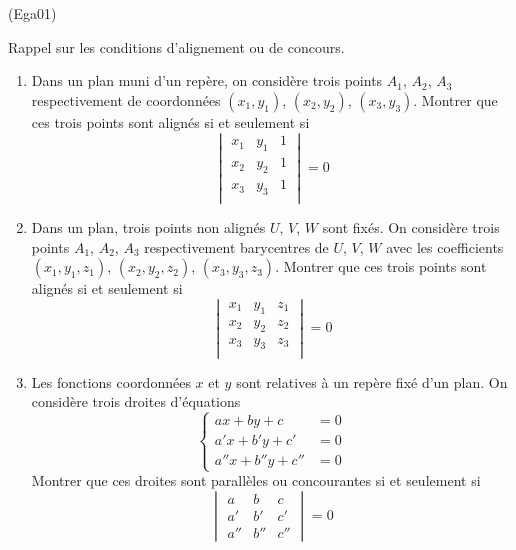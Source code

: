 \begin{tiny}(Ega01)\end{tiny} Rappel sur les conditions d'alignement ou de concours.
\begin{enumerate}
 \item Dans un plan muni d'un repère, on considère trois points $A_1$, $A_2$, $A_3$ respectivement de coordonnées $(x_1,y_1)$, $(x_2,y_2)$, $(x_3,y_3)$. Montrer que ces trois points sont alignés si et seulement si
\begin{displaymath}
 \begin{vmatrix}
  x_1 & y_1 & 1 \\
  x_2 & y_2 & 1 \\
  x_3 & y_3 & 1 \\
 \end{vmatrix}
=0
\end{displaymath}
\item Dans un plan, trois points non alignés $U$, $V$, $W$ sont fixés. On considère trois points $A_1$, $A_2$, $A_3$ respectivement barycentres de $U$, $V$, $W$ avec les coefficients $(x_1,y_1,z_1)$, $(x_2,y_2,z_2)$, $(x_3,y_3,z_3)$.
 Montrer que ces trois points sont alignés si et seulement si
\begin{displaymath}
 \begin{vmatrix}
  x_1 & y_1 & z_1 \\
  x_2 & y_2 & z_2 \\
  x_3 & y_3 & z_3 \\
 \end{vmatrix}
=0
\end{displaymath}
\item Les fonctions coordonnées $x$ et $y$ sont relatives à un repère fixé d'un plan. On considère trois droites d'équations
\begin{displaymath}
 \left\lbrace
\begin{aligned}
 ax+by+c &= 0\\a'x+b'y+c' &= 0\\a''x+b''y+c'' &= 0
\end{aligned}\right. 
\end{displaymath}
Montrer que ces droites sont parallèles ou concourantes si et seulement si
 \begin{displaymath}
  \begin{vmatrix}
   a&b&c\\a'&b'&c'\\a''&b''&c''
  \end{vmatrix}
=0
 \end{displaymath}

\end{enumerate}